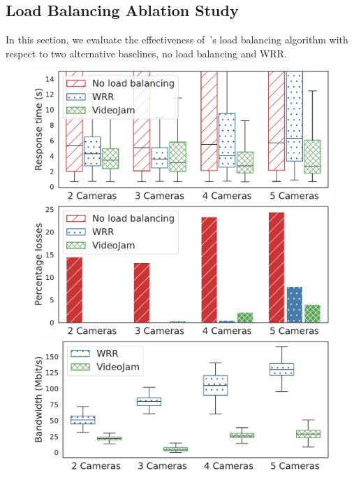 \subsection{Load Balancing Ablation Study}

In this section, we evaluate the effectiveness of~\videojam{}'s load balancing algorithm with respect to two alternative baselines, no load balancing and WRR.

\begin{figure}[htb]
	\centering
	\begin{minipage}[t]{.3\linewidth}
		\centering
		\includegraphics[width=\linewidth]{chapters/videojam/images/agains_weighted_roundrobin/response_time.pdf}
	\end{minipage}
	\hfill
	\begin{minipage}[t]{.3\linewidth}
		\centering
		\includegraphics[width=\linewidth]{chapters/videojam/images/agains_weighted_roundrobin/percentage_losses.pdf}
	\end{minipage}
	\hfill
	\begin{minipage}[t]{.3\linewidth}
		\centering
		\includegraphics[width=\linewidth]{chapters/videojam/images/agains_weighted_roundrobin/bandwidth.pdf}

\end{minipage}
\end{figure}
